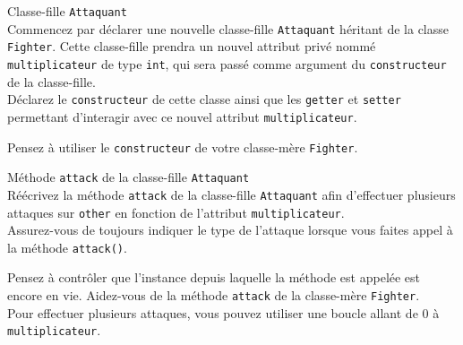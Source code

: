 \begin{Exercice}[5 minutes] Classe-fille \lstinline{Attaquant} \\

Commencez par déclarer une nouvelle classe-fille \lstinline{Attaquant} héritant de la classe \lstinline{Fighter}. Cette classe-fille prendra un nouvel attribut privé nommé \lstinline{multiplicateur} de type \lstinline{int}, qui sera passé comme argument du \lstinline{constructeur} de la classe-fille. \\

Déclarez le \lstinline{constructeur} de cette classe ainsi que les \lstinline{getter} et \lstinline{setter} permettant d'interagir avec ce nouvel attribut \lstinline{multiplicateur}. \\

\begin{conseil}
Pensez à utiliser le \lstinline{constructeur} de votre classe-mère \lstinline{Fighter}.
\end{conseil}

\begin{solution}
	
\end{solution}

\end{Exercice}

\begin{Exercice}[10 minutes] Méthode \lstinline{attack} de la classe-fille \lstinline{Attaquant} \\

Réécrivez la méthode \lstinline{attack} de la classe-fille \lstinline{Attaquant} afin d'effectuer plusieurs attaques sur \lstinline{other} en fonction de l'attribut \lstinline{multiplicateur}. \\

Assurez-vous de toujours indiquer le type de l'attaque lorsque vous faites appel à la méthode \lstinline{attack()}.

\begin{conseil}
Pensez à contrôler que l'instance depuis laquelle la méthode est appelée est encore en vie.
Aidez-vous de la méthode \lstinline{attack} de la classe-mère \lstinline{Fighter}.\\

Pour effectuer plusieurs attaques, vous pouvez utiliser une boucle allant de 0 à \lstinline{multiplicateur}.

\end{conseil}

\begin{solution}
	
\end{solution}

\end{Exercice}

